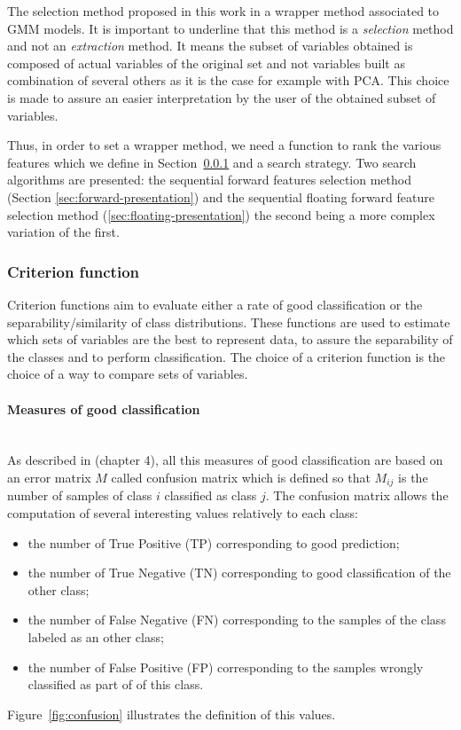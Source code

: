 \documentclass[a4paper,11pt,DIV=16,abstracton]{scrartcl}
\begin{document}
    The selection method proposed in this work in a wrapper method associated to GMM models. It is important to underline that this method is a \emph{selection} method and not an \emph{extraction} method. It means the subset of variables obtained is composed of actual variables of the original set and not variables built as combination of several others as it is the case for example with PCA. This choice is made to assure an easier interpretation by the user of the obtained subset of variables.

    Thus, in order to set a wrapper method, we need a function to rank the various features which we define in Section~\ref{sec:criterion} and a search strategy. Two search algorithms are presented: the sequential forward features selection method (Section \ref{sec:forward-presentation}) and the sequential floating forward feature selection method (\ref{sec:floating-presentation}) the second being a more complex variation of the first.

        \subsubsection{Criterion function}
        \label{sec:criterion}

        Criterion functions aim to evaluate either a rate of good classification or the separability/similarity of class distributions. These functions are used to estimate which sets of variables are the best to represent data, to assure the separability of the classes and to perform classification. The choice of a criterion function is the choice of a way to compare sets of variables.

            \paragraph{Measures of good classification}
            \label{sec:criterion-rate}

            \hspace{0pt} \\
            As described in \cite{congalton2008assessing} (chapter 4), all this measures of good classification are based on an error matrix $M$ called confusion matrix which is defined so that $M_{ij}$ is the number of samples of class $i$ classified as class $j$. The confusion matrix allows the computation of several interesting values relatively to each class:
            \begin{itemize}
                \item the number of True Positive (TP) corresponding to good prediction;
                \item the number of True Negative (TN) corresponding to good classification of the other class;
                \item the number of False Negative (FN) corresponding to the samples of the class labeled as an other class;
                \item the number of False Positive (FP) corresponding to the samples wrongly classified as part of of this class.
            \end{itemize}
            Figure~\ref{fig:confusion} illustrates the definition of this values.
\end{document}

